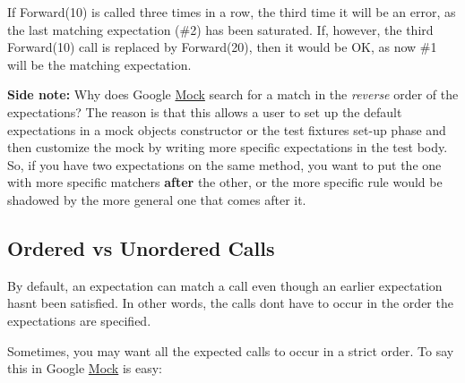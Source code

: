 \begin{DoxyCode}{0}
\end{DoxyCode}


If {\ttfamily Forward(10)} is called three times in a row, the third time it will be an error, as the last matching expectation (\#2) has been saturated. If, however, the third {\ttfamily Forward(10)} call is replaced by {\ttfamily Forward(20)}, then it would be OK, as now \#1 will be the matching expectation.

{\bfseries{Side note\+:}} Why does Google \mbox{\hyperlink{classMock}{Mock}} search for a match in the {\itshape reverse} order of the expectations? The reason is that this allows a user to set up the default expectations in a mock object\textquotesingle{}s constructor or the test fixture\textquotesingle{}s set-\/up phase and then customize the mock by writing more specific expectations in the test body. So, if you have two expectations on the same method, you want to put the one with more specific matchers {\bfseries{after}} the other, or the more specific rule would be shadowed by the more general one that comes after it.

\subsection*{Ordered vs Unordered Calls}

By default, an expectation can match a call even though an earlier expectation hasn\textquotesingle{}t been satisfied. In other words, the calls don\textquotesingle{}t have to occur in the order the expectations are specified.

Sometimes, you may want all the expected calls to occur in a strict order. To say this in Google \mbox{\hyperlink{classMock}{Mock}} is easy\+:


\begin{DoxyCode}{0}
\DoxyCodeLine{  \{}
\DoxyCodeLine{}
\DoxyCodeLine{  \}}
\DoxyCodeLine{\}}
\end{DoxyCode}


